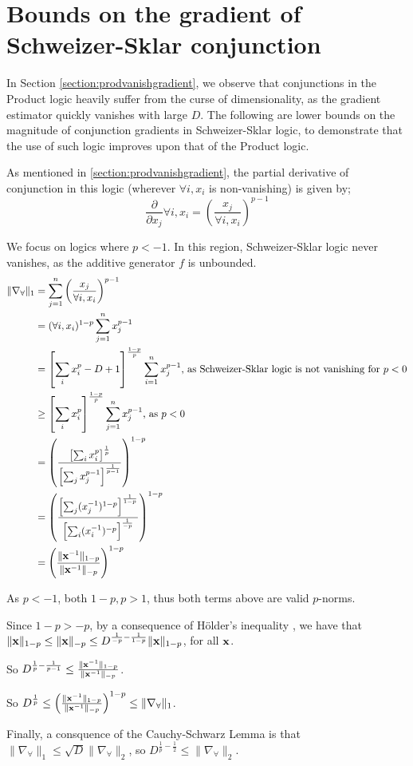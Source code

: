 \chapter{Bounds on the gradient of Schweizer-Sklar conjunction}
\label{section:ssbounds}

In Section \ref{section:prodvanishgradient}, we observe that conjunctions in the Product logic heavily suffer from the curse of dimensionality, as the gradient estimator quickly vanishes with large $D$. The following are lower bounds on the magnitude of conjunction gradients in Schweizer-Sklar logic, to demonstrate that the use of such logic improves upon that of the Product logic.

As mentioned in \ref{section:prodvanishgradient}, the partial derivative of conjunction in this logic (wherever $\forall i, x_i$ is non-vanishing) is given by;
$$\frac{\partial}{\partial x_j} \forall i, x_i = \left(\frac{x_j}{\forall i, x_i}\right)^{p-1}$$

We focus on logics where $p < -1$. In this region, Schweizer-Sklar logic never vanishes, as the additive generator $f$ is unbounded.
$$
\begin{aligned}
\lVert \nabla_\forall \rVert_1
&= \sum_{j=1}^n \left(\frac{x_j}{\forall i, x_i}\right)^{p-1} \\
&= (\forall i, x_i)^{1-p}\sum_{j=1}^nx_j^{p-1} \\
&= \left[\sum_ix_i^p-D+1\right]^\frac{1-p}{p}\sum_{i=1}^nx_j^{p-1} \text{, as Schweizer-Sklar logic is not vanishing for } p < 0 \\
&\geq \left[\sum_ix_i^p\right]^\frac{1-p}{p}\sum_{j=1}^nx_j^{p-1} \text{, as } p < 0 \\
&= \left(\frac{\left[\sum_ix_i^p\right]^\frac{1}{p}}{\left[\sum_jx_j^{p-1}\right]^\frac{1}{p-1}}\right)^{1-p} \\
&= \left(\frac{\left[\sum_j(x_j^{-1})^{1-p}\right]^\frac{1}{1-p}}{\left[\sum_i(x_i^{-1})^{-p}\right]^\frac{1}{-p}}\right)^{1-p} \\
&= \left(\frac{\lVert \mathbf{x}^{-1} \rVert_{1-p}}{\lVert \mathbf{x}^{-1} \rVert_{-p}}\right)^{1-p} \\
\end{aligned}
$$

As $p < -1$, both $1-p, p > 1$, thus both terms above are valid $p$-norms.

Since $1 - p > -p$, by a consequence of Hölder's inequality \cite[Ch. 7, Corollary 3]{realanal}, we have that $\lVert \mathbf{x} \rVert_{1-p} \leq \lVert \mathbf{x} \rVert_{-p} \leq D^{\frac{1}{-p} - \frac{1}{1-p}} \lVert \mathbf{x} \rVert_{1-p}$, for all $\mathbf{x}$.

So $D^{\frac{1}{p}-\frac{1}{p-1}} \leq \frac{\lVert \mathbf{x}^{-1} \rVert_{1-p}}{\lVert \mathbf{x}^{-1} \rVert_{-p}}$.

So $D^\frac{1}{p} \leq \left(\frac{\lVert \mathbf{x}^{-1} \rVert_{1-p}}{\lVert \mathbf{x}^{-1} \rVert_{-p}}\right)^{1-p} \leq \lVert \nabla_\forall \rVert_1$.

Finally, a consquence of the Cauchy-Schwarz Lemma is that $\lVert \nabla_\forall \rVert_1 \leq \sqrt{D}\lVert \nabla_\forall \rVert_2$, so $D^{\frac{1}{p}-\frac{1}{2}} \leq \lVert \nabla_\forall \rVert_2$.



